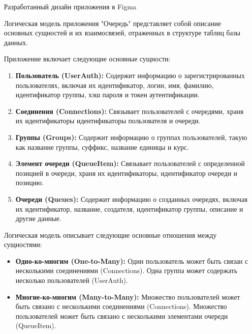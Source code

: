 \begin{image}
	\caption{Разработанный дизайн приложения в Figma}
	\label{fig:figma}
\end{image}


Логическая модель приложения "Очередь" представляет собой описание основных
сущностей и их взаимосвязей, отраженных в структуре таблиц базы данных.


Приложение включает следующие основные сущности:

\begin{enumerate}
    \item \textbf{Пользователь (UserAuth):} Содержит информацию
		о зарегистрированных пользователях, включая их идентификатор,
		логин, имя, фамилию, идентификатор группы,
		хэш пароля и токен аутентификации.
    \item \textbf{Соединения (Connections):} Связывает пользователей
		с очередями, храня их идентификаторы идентификаторы пользователя
		и очереди.
    \item \textbf{Группы (Groups):} Содержит информацию
		о группах пользователей, такую как название группы, суффикс,
		название единицы и курс.
    \item \textbf{Элемент очереди (QueueItem):} Связывает пользователей
		с определенной позицией в очереди, храня их идентификаторы,
		идентификатор очереди и позицию.
    \item \textbf{Очереди (Queues):} Содержит информацию о созданных очередях,
		включая их идентификатор, название, создателя, идентификатор группы,
		описание и другие данные.
\end{enumerate}


Логическая модель описывает следующие основные отношения между сущностями:

\begin{itemize}
    \item \textbf{Одно-ко-многим (One-to-Many):}
		Один пользователь может быть связан
		с несколькими соединениями (Connections).
		Одна группа может содержать несколько пользователей (UserAuth).
    \item \textbf{Многие-ко-многим (Many-to-Many):}
		Множество пользователей может быть связано
		с несколькими соединениями (Connections).
		Множество пользователей может быть связано
		с несколькими элементами очереди (QueueItem).
\end{itemize}

